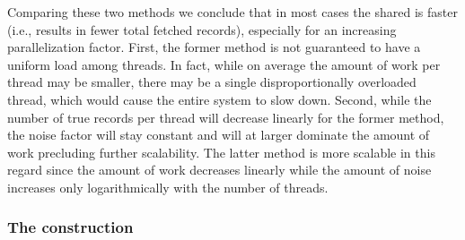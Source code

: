 				Comparing these two methods we conclude that in most cases the shared \serverDS{} is faster (i.e., results in fewer total fetched records), especially for an increasing parallelization factor.
				First, the former method is not guaranteed to have a uniform load among threads.
				In fact, while on average the amount of work per thread may be smaller, there may be a single disproportionally overloaded thread, which would cause the entire system to slow down.
				Second, while the number of true records per thread will decrease linearly for the former method, the noise factor will stay constant and will at larger \oramsNumber{} dominate the amount of work precluding further scalability.
				The latter method is more scalable in this regard since the amount of work decreases linearly while the amount of noise increases only logarithmically with the number of threads.

			\subsubsection{The construction}

